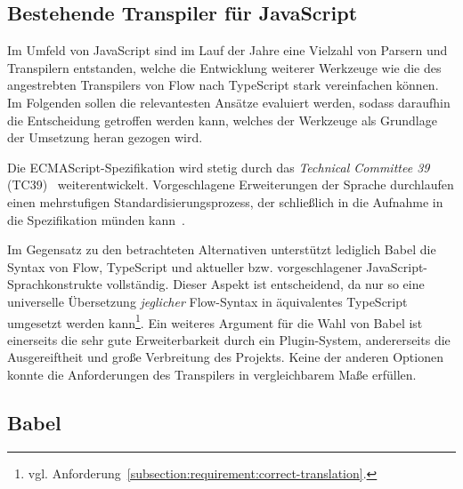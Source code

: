 \subsection{Bestehende Transpiler für JavaScript}
\label{subsec:js-transpilers}


Im Umfeld von JavaScript sind im Lauf der Jahre eine Vielzahl von Parsern und Transpilern entstanden, welche die Entwicklung weiterer Werkzeuge wie die des angestrebten Transpilers von Flow nach TypeScript stark vereinfachen können. Im Folgenden sollen die relevantesten Ansätze evaluiert werden, sodass daraufhin die Entscheidung getroffen werden kann, welches der Werkzeuge als Grundlage der Umsetzung heran gezogen wird.




Die ECMAScript-Spezifikation wird stetig durch das \textit{Technical Committee 39} (TC39)~\autocite{TC39_COMMITTEE} weiterentwickelt. Vorgeschlagene Erweiterungen der Sprache durchlaufen einen mehrstufigen Standardisierungsprozess, der schließlich in die Aufnahme in die Spezifikation münden kann~\autocite{TC39_PROCESS}.

Im Gegensatz zu den betrachteten Alternativen unterstützt lediglich Babel die Syntax von Flow, TypeScript und aktueller bzw. vorgeschlagener JavaScript-Sprachkonstrukte vollständig. Dieser Aspekt ist entscheidend, da nur so eine universelle Übersetzung \emph{jeglicher} Flow-Syntax in äquivalentes TypeScript umgesetzt werden kann\footnote{vgl. Anforderung~\ref{subsection:requirement:correct-translation}.}.
Ein weiteres Argument für die Wahl von Babel ist einerseits die sehr gute Erweiterbarkeit durch ein Plugin-System, andererseits die Ausgereiftheit und große Verbreitung des Projekts. Keine der anderen Optionen konnte die Anforderungen des Transpilers in vergleichbarem Maße erfüllen.

\subsection{Babel}
\label{sec:babel}


